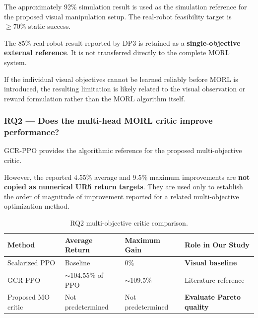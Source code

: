\documentclass[journal]{IEEEtran}
\begin{document}
The approximately 92\% simulation result is used as the simulation
reference for the proposed visual manipulation setup. The real-robot
feasibility target is $\geq70\%$ static success.

The 85\% real-robot result reported by DP3 is retained as a
\textbf{single-objective external reference}. It is not transferred
directly to the complete MORL system.

If the individual visual objectives cannot be learned reliably before
MORL is introduced, the resulting limitation is likely related to the
visual observation or reward formulation rather than the MORL
algorithm itself.


\subsubsection{RQ2 --- Does the multi-head MORL critic improve
performance?}

GCR-PPO provides the algorithmic reference for the proposed
multi-objective critic.

However, the reported 4.55\% average and 9.5\% maximum improvements are
\textbf{not copied as numerical UR5 return targets}. They are used only
to establish the order of magnitude of improvement reported for a
related multi-objective optimization method.

\begin{table}[t]
\centering
\caption{RQ2 multi-objective critic comparison.}
\label{tab:rq2}
\renewcommand{\arraystretch}{1.25}
\setlength{\tabcolsep}{4pt}

\begin{tabular}{l l l l}
\toprule
\textbf{Method}
&
\textbf{Average Return}
&
\textbf{Maximum Gain}
&
\textbf{Role in Our Study}
\\
\midrule

Scalarized PPO
&
Baseline
&
0\%
&
\textbf{Visual baseline}
\\

GCR-PPO
&
$\sim$104.55\% of PPO
&
$\sim$109.5\%
&
Literature reference
\\

Proposed MO critic
&
Not predetermined
&
Not predetermined
&
\textbf{Evaluate Pareto quality}
\\

\bottomrule
\end{tabular}
\end{table}
\end{document}
